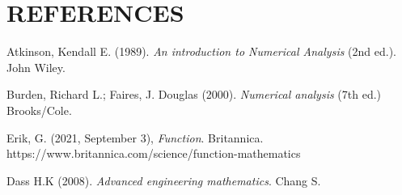 \documentclass[12pt]{report}
\begin{document}

	

		\chapter*{REFERENCES}
	\begin{description}
		\item Atkinson, Kendall E. (1989). \emph{An introduction to Numerical Analysis} (2nd ed.). John Wiley.
		
		\item Burden, Richard L.; Faires, J. Douglas (2000). \emph{Numerical analysis} (7th ed.) Brooks/Cole.
		
		\item Erik, G. (2021, September 3), \emph{Function}. Britannica.\\ https://www.britannica.com/science/function-mathematics
		
		\item Dass H.K (2008). \emph{Advanced engineering mathematics}. Chang S.
	\end{description}
\end{document}
